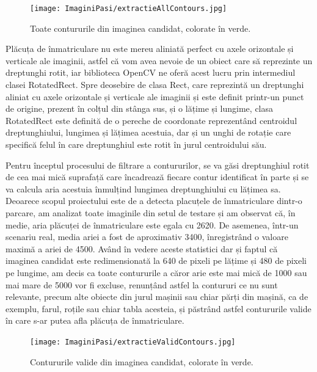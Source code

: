 \documentclass[12pt]{article}
\begin{document}
\begin{figure}[H]
  \centering
  \texttt{[image: ImaginiPasi/extractieAllContours.jpg]}
  \caption{Toate contururile din imaginea candidat, colorate \^{i}n verde.}
  \label{fig:extractie_all_contours}
\end{figure}

Pl\u{a}cuța de \^{i}nmatriculare nu este mereu aliniat\u{a} perfect cu axele orizontale și verticale ale imaginii, astfel c\u{a} vom avea nevoie de un obiect care s\u{a} reprezinte un dreptunghi rotit, iar biblioteca OpenCV ne ofer\u{a} acest lucru prin intermediul clasei RotatedRect. Spre deosebire de clasa Rect, care reprezint\u{a} un dreptunghi aliniat cu axele orizontale și verticale ale imaginii și este definit printr-un punct de origine, prezent \^{i}n colțul din st\^{a}nga sus, și o l\u{a}țime și lungime, clasa RotatedRect este definit\u{a} de o pereche de coordonate reprezent\^{a}nd centroidul dreptunghiului, lungimea și l\u{a}țimea acestuia, dar și un unghi de rotație care specific\u{a} felul \^{i}n care dreptunghiul este rotit \^{i}n jurul centroidului s\u{a}u.

Pentru \^{i}nceptul procesului de filtrare a contururilor, se va g\u{a}si dreptunghiul rotit de cea mai mic\u{a} suprafaț\u{a} care \^{i}ncadreaz\u{a} fiecare contur identificat \^{i}n parte și se va calcula aria acestuia \^{i}nmulțind lungimea dreptunghiului cu l\u{a}țimea sa. Deoarece scopul proiectului este de a detecta placuțele de \^{i}nmatriculare dintr-o parcare, am analizat toate imaginile din setul de testare și am observat c\u{a}, \^{i}n medie, aria pl\u{a}cuței de \^{i}nmatriculare este egala cu 2620. De asemenea, \^{i}ntr-un scenariu real, media ariei a fost de aproximativ 3400, \^{i}nregistr\^{a}nd o valoare maxim\u{a} a ariei de 4500. Av\^{a}nd \^{i}n vedere aceste statistici dar și faptul c\u{a} imaginea candidat este redimensionat\u{a} la 640 de pixeli pe l\u{a}țime și 480 de pixeli pe lungime, am decis ca toate contururile a c\u{a}ror arie este mai mic\u{a} de 1000 sau mai mare de 5000 vor fi excluse, renunț\^{a}nd astfel la contururi ce nu sunt relevante, precum alte obiecte din jurul mașinii sau chiar p\u{a}rți din mașin\u{a}, ca de exemplu, farul, roțile sau chiar tabla acesteia, și p\u{a}str\^{a}nd astfel contururile valide \^{i}n care s-ar putea afla pl\u{a}cuța de \^{i}nmatriculare.

\begin{figure}[H]
  \centering
  \texttt{[image: ImaginiPasi/extractieValidContours.jpg]}
  \caption{Contururile valide din imaginea candidat, colorate \^{i}n verde.}
  \label{fig:extractie_valid_contours}
\end{figure}
\end{document}
